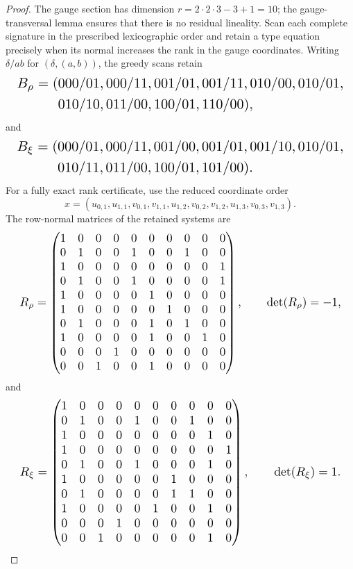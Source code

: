\documentclass{article}
\begin{document}
\begin{proof}
The gauge section has dimension \(r=2\cdot2\cdot3-3+1=10\); the gauge-transversal lemma ensures that there is no residual lineality. Scan each complete signature in the prescribed lexicographic order and retain a type equation precisely when its normal increases the rank in the gauge coordinates. Writing \(\delta/ab\) for \((\delta,(a,b))\), the greedy scans retain
\[
\makebox[\linewidth][c]{\resizebox{0.98\linewidth}{!}{\(\displaystyle \begin{aligned}
B_{\rho}=(&000/01,000/11,001/01,001/11,010/00,010/01,\\
&010/10,011/00,100/01,110/00),
\end{aligned}\)}}
\]
and
\[
\makebox[\linewidth][c]{\resizebox{0.98\linewidth}{!}{\(\displaystyle \begin{aligned}
B_{\xi}=(&000/01,000/11,001/00,001/01,001/10,010/01,\\
&010/11,011/00,100/01,101/00).
\end{aligned}\)}}
\]
For a fully exact rank certificate, use the reduced coordinate order
\[
x=(u_{0,1},u_{1,1},v_{0,1},v_{1,1},u_{1,2},v_{0,2},v_{1,2},u_{1,3},v_{0,3},v_{1,3}).
\]
The row-normal matrices of the retained systems are
\[
\makebox[\linewidth][c]{\resizebox{0.98\linewidth}{!}{\par\noindent \makebox[\linewidth][c]{\resizebox{0.98\linewidth}{!}{\(\displaystyle \displaystyle R_{\rho}=\begin{pmatrix}1&0&0&0&0&0&0&0&0&0\\0&1&0&0&1&0&0&1&0&0\\1&0&0&0&0&0&0&0&0&1\\0&1&0&0&1&0&0&0&0&1\\1&0&0&0&0&1&0&0&0&0\\1&0&0&0&0&0&1&0&0&0\\0&1&0&0&0&1&0&1&0&0\\1&0&0&0&0&1&0&0&1&0\\0&0&0&1&0&0&0&0&0&0\\0&0&1&0&0&1&0&0&0&0\end{pmatrix},\qquad \det(R_{\rho})=-1,\)}}\par\noindent}}
\]
and
\[
\makebox[\linewidth][c]{\resizebox{0.98\linewidth}{!}{\par\noindent \makebox[\linewidth][c]{\resizebox{0.98\linewidth}{!}{\(\displaystyle \displaystyle R_{\xi}=\begin{pmatrix}1&0&0&0&0&0&0&0&0&0\\0&1&0&0&1&0&0&1&0&0\\1&0&0&0&0&0&0&0&1&0\\1&0&0&0&0&0&0&0&0&1\\0&1&0&0&1&0&0&0&1&0\\1&0&0&0&0&0&1&0&0&0\\0&1&0&0&0&0&1&1&0&0\\1&0&0&0&0&1&0&0&1&0\\0&0&0&1&0&0&0&0&0&0\\0&0&1&0&0&0&0&0&1&0\end{pmatrix},\qquad \det(R_{\xi})=1.\)}}\par\noindent}}
\]
\end{proof}
\end{document}
